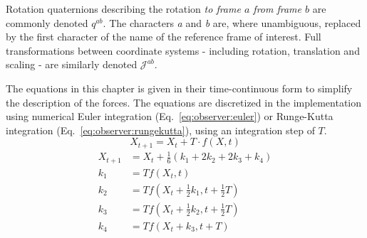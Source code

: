         Rotation quaternions describing the rotation \textit{to frame \textbf{$a$} from frame \textbf{$b$}}
        are commonly denoted $q^{ab}$.
        The characters \textit{a} and \textit{b} are, where unambiguous, replaced by the first character of the
        name of the reference frame of interest.
        Full transformations between coordinate systems - including rotation, translation and scaling -
        are similarly denoted $\mathcal{J}^{ab}$.

        The equations in this chapter is given in their time-continuous form
        to simplify the description of the forces.
        The equations are discretized in the implementation using numerical Euler integration (Eq.~\eqref{eq:observer:euler})
        or Runge-Kutta integration (Eq.~\eqref{eq:observer:rungekutta}), using an integration step of $T$.
        \begin{equation}
        \label{eq:observer:euler}
            X_{t+1} = X_{t} + T \cdot f(X,t)
        \end{equation}
        \begin{subequations}
        \label{eq:observer:rungekutta}
            \begin{align}
                X_{t+1} &= X_{t} + \tfrac{1}{6} \left(k_1 + 2k_2 + 2k_3 + k_4 \right) \\
                k_1 &= Tf(X_{t}, t) \\
                k_2 &= Tf(X_{t} + \tfrac{1}{2} k_1, t + \tfrac{1}{2}T) \\
                k_3 &= Tf(X_{t} + \tfrac{1}{2} k_2, t + \tfrac{1}{2}T) \\
                k_4 &= Tf(X_{t} + k_3, t + T)
            \end{align}
        \end{subequations}

